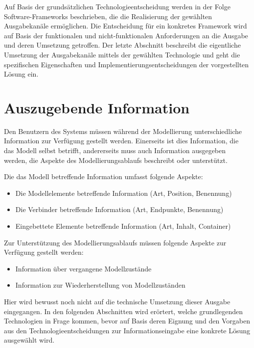 Auf Basis der grundsätzlichen Technologieentscheidung werden in der Folge Software-Frameworks beschrieben, die die Realisierung der gewählten Ausgabekanäle ermöglichen. Die Entscheidung für ein konkretes Framework wird auf Basis der funktionalen und nicht-funktionalen Anforderungen an die Ausgabe und deren Umsetzung getroffen. Der letzte Abschnitt beschreibt die eigentliche Umsetzung der Ausgabekanäle mittels der gewählten Technologie und geht die spezifischen Eigenschaften und Implementierungsentscheidungen der vorgestellten Lösung ein.

\section{Auszugebende Information} %
\label{sec:auszugebende_information}

Den Benutzern des Systems müssen während der Modellierung unterschiedliche Information zur Verfügung gestellt werden. Einerseits ist dies Information, die das Modell selbst betrifft, andererseits muss auch Information ausgegeben werden, die Aspekte des Modellierungsablaufs beschreibt oder unterstützt.

Die das Modell betreffende Information umfasst folgende Aspekte:
\begin{itemize}
 \item Die Modellelemente betreffende Information (Art, Position, Benennung)
 \item Die Verbinder betreffende Information (Art, Endpunkte, Benennung)
 \item Eingebettete Elemente betreffende Information (Art, Inhalt, Container)
\end{itemize}

Zur Unterstützung des Modellierungsablaufs müssen folgende Aspekte zur Verfügung gestellt werden:
\begin{itemize}
 \item Information über vergangene Modellzustände
 \item Information zur Wiederherstellung von Modellzuständen
\end{itemize}

Hier wird bewusst noch nicht auf die technische Umsetzung dieser Ausgabe eingegangen. In den folgenden Abschnitten wird erörtert, welche grundlegenden Technologien in Frage kommen, bevor auf Basis deren Eignung und den Vorgaben aus den Technologieentscheidungen zur Informationseingabe eine konkrete Lösung ausgewählt wird.


